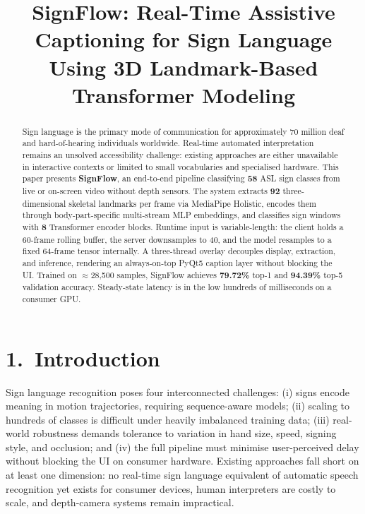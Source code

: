 \documentclass[10pt, twocolumn]{article}
\title{\textbf{SignFlow: Real-Time Assistive Captioning for Sign Language\\
Using 3D Landmark-Based Transformer Modeling}}
\author{}
\date{}
\begin{document}
\maketitle

\begin{abstract}
Sign language is the primary mode of communication for approximately 70 million deaf and hard-of-hearing individuals worldwide. Real-time automated interpretation remains an unsolved accessibility challenge: existing approaches are either unavailable in interactive contexts or limited to small vocabularies and specialised hardware. This paper presents \textbf{SignFlow}, an end-to-end pipeline classifying \textbf{58} ASL sign classes from live or on-screen video without depth sensors. The system extracts \textbf{92} three-dimensional skeletal landmarks per frame via MediaPipe Holistic, encodes them through body-part-specific multi-stream MLP embeddings, and classifies sign windows with \textbf{8} Transformer encoder blocks. Runtime input is variable-length: the client holds a 60-frame rolling buffer, the server downsamples to 40, and the model resamples to a fixed 64-frame tensor internally. A three-thread overlay decouples display, extraction, and inference, rendering an always-on-top PyQt5 caption layer without blocking the UI. Trained on $\approx$28,500 samples, SignFlow achieves \textbf{79.72\%} top-1 and \textbf{94.39\%} top-5 validation accuracy. Steady-state latency is in the low hundreds of milliseconds on a consumer GPU.
\end{abstract}

\section*{1.~Introduction}
Sign language recognition poses four interconnected challenges: (i) signs encode meaning in motion trajectories, requiring sequence-aware models; (ii) scaling to hundreds of classes is difficult under heavily imbalanced training data; (iii) real-world robustness demands tolerance to variation in hand size, speed, signing style, and occlusion; and (iv) the full pipeline must minimise user-perceived delay without blocking the UI on consumer hardware. Existing approaches fall short on at least one dimension: no real-time sign language equivalent of automatic speech recognition yet exists for consumer devices, human interpreters are costly to scale, and depth-camera systems remain impractical.
\end{document}
